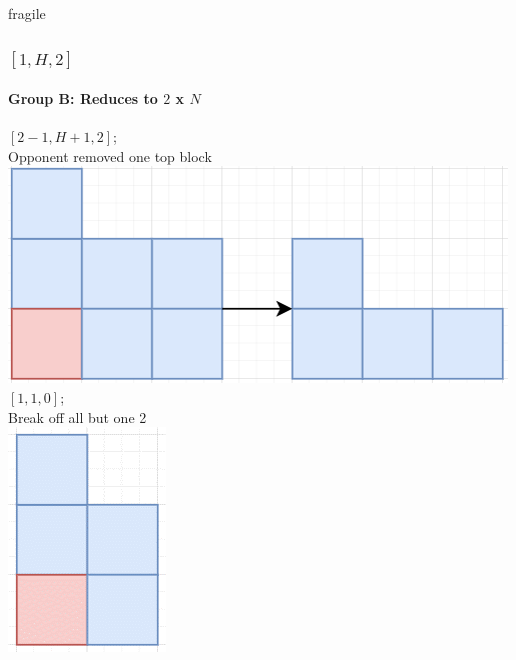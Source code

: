 \documentclass[aspectratio=169,usenames,dvipsnames]{beamer}
\begin{document}
\begin{frame}{fragile}
    \frametitle{$[1, H, 2]$}
    \framesubtitle{Group B: Reduces to $2$ x $N$}
    
    \begin{multicols}{2}
    $[2 - 1, H + 1, 2]$; \\
    Opponent removed one top block\\
    \includegraphics[scale=.4]{images/[1, H, 2].png}\\
    $[1, 1, 0]$; \\
    Break off all but one 2\\
    \includegraphics[scale=.4]{images/[1, 1, 0].png}
    \end{multicols}
\end{frame}
\end{document}
